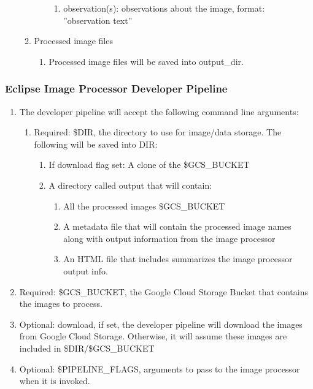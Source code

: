\documentclass[10pt, onecolumn, draftclsnofoot, letterpaper, compsoc]{IEEEtran}
\begin{document}
\begin{enumerate}
\begin{enumerate}
\begin{enumerate}
\begin{enumerate}
                    \item observation(s): observations about the image, format: ''observation text''

                \end{enumerate}
		 	\end{enumerate}

            \item Processed image files
				\begin{enumerate}
					 \item Processed image files will be saved into output\_dir.
				\end{enumerate}
		 \end{enumerate}

	\end{enumerate}

\subsubsection{Eclipse Image Processor Developer Pipeline}
	\begin{enumerate}
		\item The developer pipeline will accept the following command line arguments:
            \begin{enumerate}
                \item Required: \$DIR, the directory to use for image/data storage. The following will be saved into DIR:
                \begin{enumerate}
                    \item If download flag set: A clone of the \$GCS\_BUCKET
                    \item A directory called output that will contain:
                    \begin{enumerate}
                        \item All the processed images \$GCS\_BUCKET
                        \item A metadata file that will contain the processed image names along with output information from the image processor
                        \item An HTML file that includes summarizes the image processor output info.
                    \end{enumerate}
                \end{enumerate}
            \end{enumerate}

        \item Required: \$GCS\_BUCKET, the Google Cloud Storage Bucket that contains the images to process.

        \item Optional: download, if set, the developer pipeline will download the images from Google Cloud Storage.
        Otherwise, it will assume these images are included in \$DIR/\$GCS\_BUCKET

        \item Optional: \$PIPELINE\_FLAGS, arguments to pass to the image processor when it is invoked.

	\end{enumerate}
\end{document}
